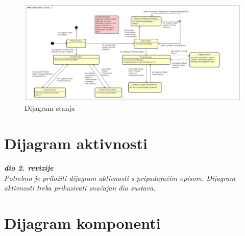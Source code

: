 			\begin{figure}[H]
				\includegraphics[scale=0.3]{slike/Dijagram stanja - Pacijent.PNG} %
				\centering
				\caption{Dijagram stanja}
				\label{fig:dijagram_stanja1}
			\end{figure}
			
			
			\eject 
		
		\section{Dijagram aktivnosti}
			
			\textbf{\textit{dio 2. revizije}}\\
			
			 \textit{Potrebno je priložiti dijagram aktivnosti s pripadajućim opisom. Dijagram aktivnosti treba prikazivati značajan dio sustava.}
			
			\eject
		\section{Dijagram komponenti}
		
